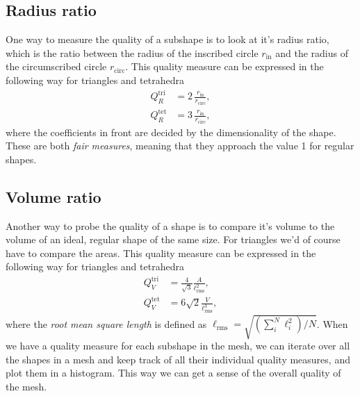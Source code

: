 \documentclass[acmtog]{acmart}
\begin{document}
\subsection*{Radius ratio}
One way to measure the quality of a subshape is to look at it's radius ratio,
which is the ratio between the radius of the inscribed circle $r_\mathrm{in}$
and the radius of the circumscribed circle $r_\mathrm{circ}$. This quality
measure can be expressed in the following way for triangles and tetrahedra
%
\begin{align}
  Q_R^\mathrm{tri} & = 2 \, \frac{r_\mathrm{in}}{r_\mathrm{circ}}, \\
  Q_R^\mathrm{tet} & = 3 \, \frac{r_\mathrm{in}}{r_\mathrm{circ}},
\end{align}
%
where the coefficients in front are decided by the dimensionality of the shape.
These are both \textit{fair measures}, meaning that they approach the value 1
for regular shapes.

\subsection*{Volume ratio}
Another way to probe the quality of a shape is to compare it's volume to the
volume of an ideal, regular shape of the same size. For triangles we'd of
course have to compare the areas. This quality measure can be expressed in the
following way for triangles and tetrahedra
%
\begin{align}
  Q_V^\mathrm{tri} & = \frac{4}{\sqrt{3}}\frac{A}{\ell_\mathrm{rms}^2}, \\
  Q_V^\mathrm{tet} & = 6 \sqrt{2} \frac{V}{\ell_\mathrm{rms}^3},
\end{align}
%
where the \textit{root mean square length} is defined as $\ell_\mathrm{rms} =
  \sqrt{(\sum_i^N \ell_i^2)/N} $. When we have a quality measure for each
subshape in the mesh, we can iterate over all the shapes in a mesh and keep
track of all their individual quality measures, and plot them in a histogram.
This way we can get a sense of the overall quality of the mesh.
\end{document}
